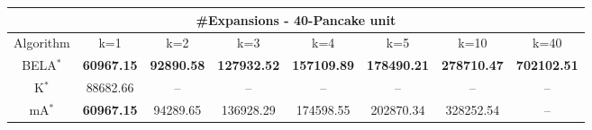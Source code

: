 \begin{tabular}{c|ccccccc}\toprule
\multicolumn{8}{c}{#Expansions - 40-Pancake unit}\\ \midrule
Algorithm & k=1 & k=2 & k=3 & k=4 & k=5 & k=10 & k=40 \\ \midrule
BELA$^*$ & \textbf{60967.15} & \textbf{92890.58} & \textbf{127932.52} & \textbf{157109.89} & \textbf{178490.21} & \textbf{278710.47} & \textbf{702102.51} \\
K$^*$ & 88682.66 & -- & -- & -- & -- & -- & -- \\
mA$^*$ & \textbf{60967.15} & 94289.65 & 136928.29 & 174598.55 & 202870.34 & 328252.54 & -- \\ \bottomrule 
\end{tabular}
